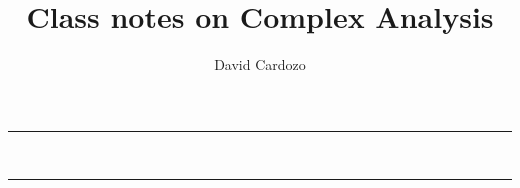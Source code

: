 \documentclass[notitlepage]{article}
\author{David Cardozo}
\title{Class notes on Complex Analysis}
\begin{document}



\noindent\rule{\textwidth}{1pt}\\[-0.1cm]


\noindent\rule{\textwidth}{1pt}\\[-0.1cm]


	
	
\end{document}
